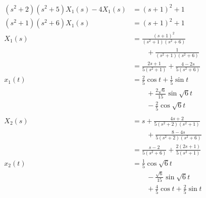 \documentclass{article}
\begin{document}
\begin{align*}
  (s^2 + 2) (s^2 + 5) X_1(s) - 4 X_1(s)                             & = (s + 1)^2 + 1                                                                       \\
  (s^2 + 1) (s^2 + 6) X_1(s)                                        & = (s + 1)^2 + 1                                                                       \\
  X_1(s)                                                            & = \frac{(s + 1)^2}{(s^2 + 1) (s^2 + 6)}                                               \\
                                                                    & \qquad + \frac{1}{(s^2 + 1) (s^2 + 6)}                                                \\
                                                                    & = \frac{2 s + 1}{5 \left( s^2 + 1 \right)} + \frac{4 - 2 s}{5 \left( s^2 + 6 \right)} \\
  x_1(t)                                                            & = \frac{2}{5} \cos t + \frac{1}{5} \sin t                                             \\
                                                                    & \qquad + \frac{2 \sqrt{6}}{15} \sin \sqrt{6} t                                        \\
                                                                    & \qquad - \frac{2}{5} \cos \sqrt{6} t                                                  \\ \\
  X_2(s)                                                            & = s + \frac{4 s + 2}{5 (s^2 + 2) (s^2 + 1)}                                           \\
                                                                    & \qquad + \frac{8 - 4 s}{5 (s^2 + 2) (s^2 + 6)}                                        \\
                                                                    & = \frac{s - 2}{5 (s^2 + 6)} + \frac{2 (2 s + 1)}{5 (s^2 + 1)}                         \\
  x_2(t)                                                            & = \frac{1}{5} \cos \sqrt{6} t                                                         \\
                                                                    & \qquad - \frac{\sqrt{6}}{15} \sin \sqrt{6} t                                          \\
                                                                    & \qquad + \frac{4}{5} \cos t + \frac{2}{5} \sin t
\end{align*}
\end{document}
